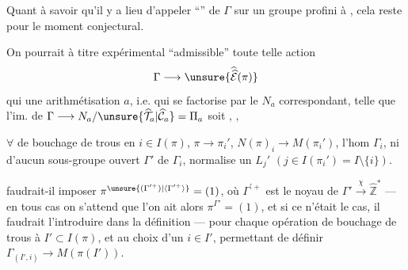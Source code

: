 Quant à savoir  qu'il y a lieu
d'appeler   ``'' de
$\Gamma$ sur un groupe  \unsure{(}profini\unsure{)|,} à ,
cela reste pour le moment conjectural.

On pourrait à titre expérimental
 
``admissible'' toute telle action
\[
 \Gamma\longrightarrow\unsure{\widehat{\widehat{\mathcal E}}(\pi)}
\]
qui  une arithmétisation $a$,
i.e. qui se factorise par le $N_a$ correspondant,  telle que l'im. de
$\Gamma\longrightarrow N_a/\unsure{\widehat{\mathcal T}_a|\widehat{\mathcal C}_a}=\Pi_a$
soit ,
, 

$\forall$  de bouchage de trous en $i\in I(\pi)$,
$\pi\longrightarrow\pi_i'$, $N(\pi)_i\longrightarrow M(\pi_i')$, l'hom 
$\Gamma_i$, ni d'aucun sous-groupe ouvert $\Gamma'$
de $\Gamma_i$,  normalise un $L_j'$ $(j\in I(\pi_i')=I\setminus\{i\})$.


  faudrait-il imposer
$\pi^{\unsure{(\Gamma^{\prime+})|\langle\Gamma^{\prime+}\rangle}}=(1)$, où $\Gamma^{\prime+}$ est le noyau de
$\Gamma'\xrightarrow{\chi}\widehat{\mathbb Z}^{*}$ --- en tous cas on s'attend
\unsure{---} que l'on ait alors $\pi^{\Gamma'}=(1)$,
et si ce n'était le cas, il faudrait
l'introduire dans la définition --- pour
chaque opération de bouchage de trous
 à $I'\subset I(\pi)$, et au choix d'un
$i\in I'$, permettant de définir $\Gamma_{(I',i)}\longrightarrow M(\pi(I'))$.

